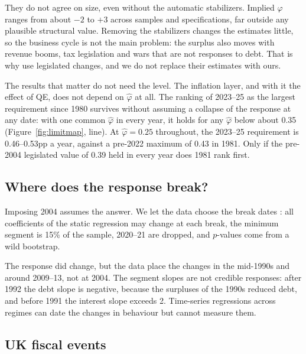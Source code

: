 They do not agree on size, even without the automatic stabilizers. Implied $\varphi$ ranges from about $-2$ to $+3$ across samples and specifications, far outside any plausible structural value. Removing the stabilizers changes the estimates little, so the business cycle is not the main problem: the surplus also moves with revenue booms, tax legislation and wars that are not responses to debt. That is why \citet{auerbach2024} use legislated changes, and we do not replace their estimates with ours.

The results that matter do not need the level. The inflation layer, and with it the effect of QE, does not depend on $\hat\varphi$ at all. The ranking of 2023--25 as the largest requirement since 1980 survives without assuming a collapse of the response at any date: with one common $\hat\varphi$ in every year, it holds for any $\hat\varphi$ below about 0.35 (Figure~\ref{fig:limitmap}, line). At $\hat\varphi=0.25$ throughout, the 2023--25 requirement is 0.46--0.53pp a year, against a pre-2022 maximum of 0.43 in 1981. Only if the pre-2004 legislated value of 0.39 held in every year does 1981 rank first.

\subsection{Where does the response break?}\label{app:breaks}

Imposing 2004 assumes the answer. We let the data choose the break dates \citep{bai1998,bai2003}: all coefficients of the static regression may change at each break, the minimum segment is 15\% of the sample, 2020--21 are dropped, and $p$-values come from a wild bootstrap.



The response did change, but the data place the changes in the mid-1990s and around 2009--13, not at 2004. The segment slopes are not credible responses: after 1992 the debt slope is negative, because the surpluses of the 1990s reduced debt, and before 1991 the interest slope exceeds 2. Time-series regressions across regimes can date the changes in behaviour but cannot measure them.

\subsection{UK fiscal events}\label{app:obr}

